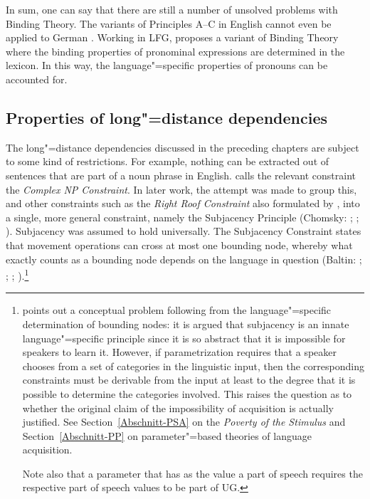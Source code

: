 In sum, one can say that there are still a number of unsolved problems with Binding Theory. The
\hpsg variants of Principles A--C in English cannot
even be applied to German \citep[Chapter~20]{Mueller99a}. Working in LFG, \citet{Dalrymple93a} proposes a variant of Binding Theory where the binding
properties of pronominal expressions are determined in the lexicon. In this way, the language"=specific properties of pronouns can be accounted for.

\subsection{Properties of long"=distance dependencies}
\label{Abschnitt-Fernabhängigkeiten}

The 
long"=distance dependencies discussed in the preceding chapters are subject
to some kind of restrictions. For example, nothing can be extracted out of sentences that are part of a noun phrase in English. \citet[]{Ross67} calls the relevant constraint the \emph{Complex NP Constraint}. In later work, the attempt was made to group this, and other constraints such as the
\emph{Right Roof Constraint} also formulated by  \citet[Section~5.1.2]{Ross67}, into a single, more general constraint, namely the Subjacency Principle
	(Chomsky: \citeyear[]{Chomsky73a}; \citeyear[]{Chomsky86b}; \citealp{Baltin81a,Baltin2006a}).
Subjacency was assumed to hold universally.
The Subjacency Constraint states that movement operations can cross at most one bounding node, whereby what exactly counts as a bounding node
depends on the language in question (Baltin: \citeyear[]{Baltin81a};
\citeyear{Baltin2006a}; \citealp[]{Rizzi82b}; \citealp[--40]{Chomsky86b}).\footnote{
	 \citet[--540]{Newmeyer2004a} points out a conceptual problem following from the language"=specific determination of bounding nodes: it is argued
	 that subjacency is an innate language"=specific principle since it is so abstract that it is impossible for speakers to learn it. However, if parametrization
	 requires that a speaker chooses from  a set of categories in the linguistic input, then the corresponding constraints must be derivable from the input at least to
	 the degree that it is possible to determine the categories involved. This raises the question as to whether the original claim of the impossibility of acquisition
	 is actually justified. See Section~\ref{Abschnitt-PSA} on the  \emph{Poverty of the Stimulus}
	 and Section~\ref{Abschnitt-PP} on parameter"=based theories of language
         acquisition.

         Note also that a parameter that has as the value a part of speech requires the respective
         part of speech values to be part of UG.
}

